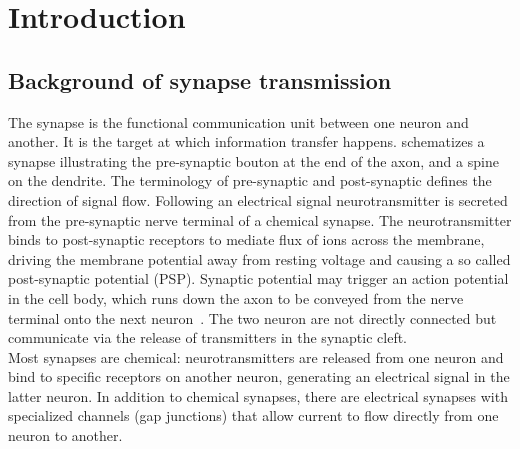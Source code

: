 %

\chapter{Introduction}\label{chap1}
\ifpdf
    \graphicspath{{Chapter1/Chapter1Figs/PNG/}{Chapter1/Chapter1Figs/PDF/}{Chapter1/Chapter1Figs/}}
\else
    \graphicspath{{Chapter1/Chapter1Figs/EPS/}{Chapter1/Chapter1Figs/}}
\fi

\section{Background of synapse transmission}

The synapse is the functional communication unit between one neuron
and another.  It is the target at which information transfer happens.
 schematizes a synapse illustrating the pre-synaptic
bouton at the end of the axon, and a spine on the dendrite. The
terminology of pre-synaptic and post-synaptic defines the direction
of signal flow. Following an electrical signal neurotransmitter is
secreted from the pre-synaptic nerve terminal of a chemical synapse. 
The neurotransmitter binds to post-synaptic receptors to mediate flux
of ions across the membrane, driving the membrane potential away from
resting voltage and causing a so called post-synaptic potential (PSP).
Synaptic potential may trigger an action potential in the cell body,
which runs down the axon to be conveyed from the nerve terminal onto
the next neuron~\cite{Ral98}.  The two neuron are not directly
connected but communicate via the release of transmitters in the
synaptic cleft.\\

Most synapses are chemical: neurotransmitters are released from one
neuron and bind to specific receptors on another neuron, generating
an electrical signal in the latter neuron. In addition to chemical
synapses, there are electrical synapses with specialized channels
(gap junctions) that allow current to flow directly from one neuron
to another.  \\

